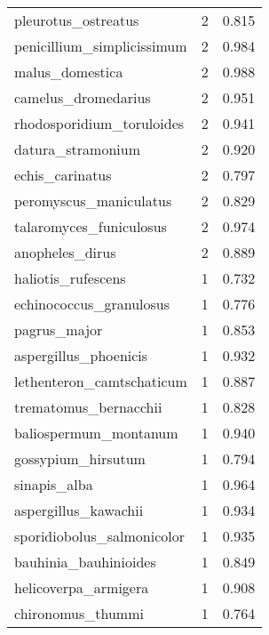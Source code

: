 \begin{tabular}{lrr}
            pleurotus\_ostreatus &                   2 &     0.815 \\
     penicillium\_simplicissimum &                   2 &     0.984 \\
                malus\_domestica &                   2 &     0.988 \\
            camelus\_dromedarius &                   2 &     0.951 \\
      rhodosporidium\_toruloides &                   2 &     0.941 \\
              datura\_stramonium &                   2 &     0.920 \\
                echis\_carinatus &                   2 &     0.797 \\
         peromyscus\_maniculatus &                   2 &     0.829 \\
        talaromyces\_funiculosus &                   2 &     0.974 \\
                anopheles\_dirus &                   2 &     0.889 \\
             haliotis\_rufescens &                   1 &     0.732 \\
        echinococcus\_granulosus &                   1 &     0.776 \\
                   pagrus\_major &                   1 &     0.853 \\
          aspergillus\_phoenicis &                   1 &     0.932 \\
      lethenteron\_camtschaticum &                   1 &     0.887 \\
          trematomus\_bernacchii &                   1 &     0.828 \\
          baliospermum\_montanum &                   1 &     0.940 \\
             gossypium\_hirsutum &                   1 &     0.794 \\
                   sinapis\_alba &                   1 &     0.964 \\
           aspergillus\_kawachii &                   1 &     0.934 \\
     sporidiobolus\_salmonicolor &                   1 &     0.935 \\
          bauhinia\_bauhinioides &                   1 &     0.849 \\
           helicoverpa\_armigera &                   1 &     0.908 \\
              chironomus\_thummi &                   1 &     0.764 \\

\end{tabular}
